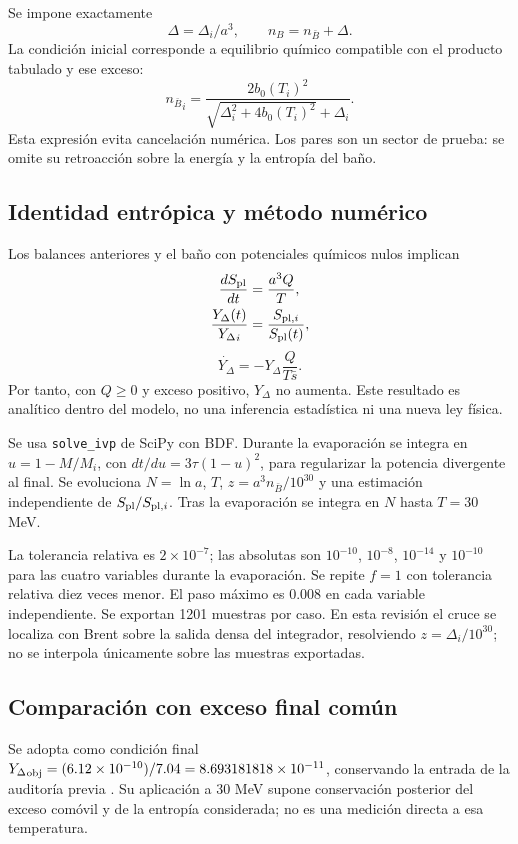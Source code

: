 \documentclass[10pt,twocolumn,a4paper]{article}
\newcommand{\nb}{{n_{\bar B}}}
\newcommand{\Y}{{Y_\Delta}}
\newcommand{\sbar}{\bar s}
\begin{document}
Se impone exactamente
\begin{equation}\label{eq:net}
\Delta=\Delta_i/a^3,\qquad n_B=\nb+\Delta.
\end{equation}
La condición inicial corresponde a equilibrio químico compatible con el producto tabulado y ese exceso:
\begin{equation}
\nb_i=\frac{2b_0(T_i)^2}{\sqrt{\Delta_i^2+4b_0(T_i)^2}+\Delta_i}.
\end{equation}
Esta expresión evita cancelación numérica. Los pares son un sector de prueba: se omite su retroacción sobre la energía y la entropía del baño.

\subsection{Identidad entrópica y método numérico}
Los balances anteriores y el baño con potenciales químicos nulos implican
\begin{align}
\frac{dS_{\rm pl}}{dt}&=\frac{a^3Q}{T},\\
\frac{\Y(t)}{\Y_i}&=\frac{S_{{\rm pl},i}}{S_{\rm pl}(t)},\label{eq:dil}
\end{align}
\begin{equation}
\dot\Y=-\Y\frac{Q}{T\sbar}.
\end{equation}
Por tanto, con $Q\geq0$ y exceso positivo, $\Y$ no aumenta. Este resultado es analítico dentro del modelo, no una inferencia estadística ni una nueva ley física.

Se usa \texttt{solve\_ivp} de SciPy con BDF. Durante la evaporación se integra en $u=1-M/M_i$, con $dt/du=3\tau(1-u)^2$, para regularizar la potencia divergente al final. Se evoluciona $N=\ln a$, $T$, $z=a^3\nb/10^{30}$ y una estimación independiente de $S_{\rm pl}/S_{{\rm pl},i}$. Tras la evaporación se integra en $N$ hasta $T=30$ MeV.

La tolerancia relativa es $2\times10^{-7}$; las absolutas son $10^{-10}$, $10^{-8}$, $10^{-14}$ y $10^{-10}$ para las cuatro variables durante la evaporación. Se repite $f=1$ con tolerancia relativa diez veces menor. El paso máximo es 0.008 en cada variable independiente. Se exportan 1201 muestras por caso. En esta revisión el cruce se localiza con Brent sobre la salida densa del integrador, resolviendo $z=\Delta_i/10^{30}$; no se interpola únicamente sobre las muestras exportadas.

\subsection{Comparación con exceso final común}
Se adopta como condición final $\Y_{\rm obj}=(6.12\times10^{-10})/7.04=8.693181818\times10^{-11}$, conservando la entrada de la auditoría previa \cite{garcia}. Su aplicación a 30 MeV supone conservación posterior del exceso comóvil y de la entropía considerada; no es una medición directa a esa temperatura.
\end{document}
